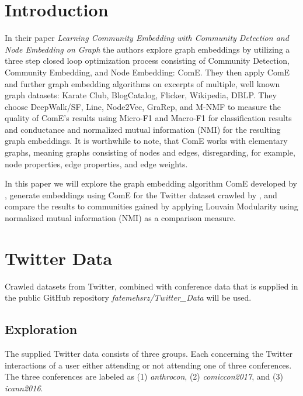 \documentclass[sigconf]{acmart}
\begin{document}
\section{Introduction}

In their \citeyear{Cav17} paper \textit{Learning Community Embedding with Community Detection and Node Embedding on Graph} the authors \citeauthor{Cav17} explore graph embeddings by utilizing a three step closed loop optimization process consisting of Community Detection, Community Embedding, and Node Embedding: ComE.\cite{Cav17} They then apply ComE and further graph embedding algorithms on excerpts of multiple, well known graph datasets: Karate Club, BlogCatalog, Flicker, Wikipedia, DBLP. They choose DeepWalk/SF, Line, Node2Vec, GraRep, and M-NMF to measure the quality of ComE's results using Micro-F1 and Macro-F1 for classification results and conductance and normalized mutual information (NMI) for the resulting graph embeddings. It is worthwhile to note, that ComE works with elementary graphs, meaning graphs consisting of nodes and edges, disregarding, for example, node properties, edge properties, and edge weights.

In this paper we will explore the graph embedding algorithm ComE developed by \citeauthor{Cav17}, generate embeddings using ComE for the Twitter dataset \cite{TwitterData} crawled by \citeauthor{TwitterData}, and compare the results to communities gained by applying Louvain Modularity using normalized mutual information (NMI) as a comparison measure.


\section{Twitter Data} \label{Twitter_data}

Crawled datasets from Twitter, combined with conference data that is supplied in the public GitHub repository \textit{fatemehsrz/Twitter\_Data} will be used.\cite{TwitterData}

\subsection{Exploration}

The supplied Twitter data consists of three groups. Each concerning the Twitter interactions of a user either attending or not attending one of three conferences. The three conferences are labeled as (1) \textit{anthrocon}, (2) \textit{comiccon2017}, and (3) \textit{icann2016}.
\end{document}
